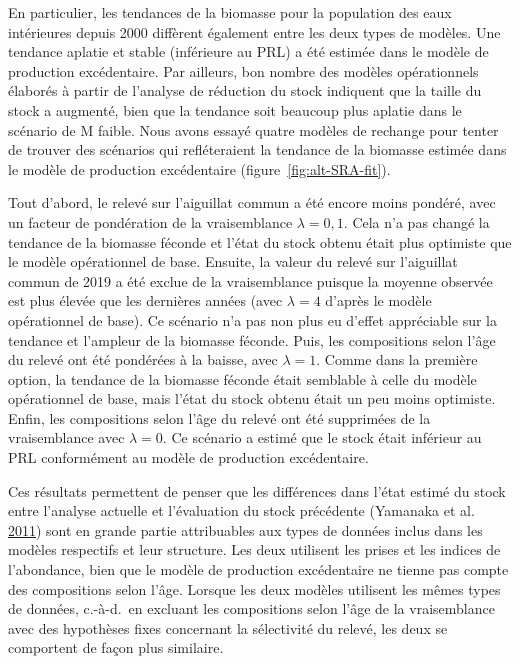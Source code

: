 \documentclass[french,11pt]{book}
\begin{document}
En particulier, les tendances de la biomasse pour la population des eaux intérieures depuis 2000 diffèrent également entre les deux types de modèles. Une tendance aplatie et stable (inférieure au PRL) a été estimée dans le modèle de production excédentaire. Par ailleurs, bon nombre des modèles opérationnels élaborés à partir de l'analyse de réduction du stock indiquent que la taille du stock a augmenté, bien que la tendance soit beaucoup plus aplatie dans le scénario de M faible. Nous avons essayé quatre modèles de rechange pour tenter de trouver des scénarios qui refléteraient la tendance de la biomasse estimée dans le modèle de production excédentaire (figure~\ref{fig:alt-SRA-fit}).

Tout d'abord, le relevé sur l'aiguillat commun a été encore moins pondéré, avec un facteur de pondération de la vraisemblance \(\lambda = 0,1\). Cela n'a pas changé la tendance de la biomasse féconde et l'état du stock obtenu était plus optimiste que le modèle opérationnel de base. Ensuite, la valeur du relevé sur l'aiguillat commun de 2019 a été exclue de la vraisemblance puisque la moyenne observée est plus élevée que les dernières années (avec \(\lambda = 4\) d'après le modèle opérationnel de base). Ce scénario n'a pas non plus eu d'effet appréciable sur la tendance et l'ampleur de la biomasse féconde. Puis, les compositions selon l'âge du relevé ont été pondérées à la baisse, avec \(\lambda = 1\). Comme dans la première option, la tendance de la biomasse féconde était semblable à celle du modèle opérationnel de base, mais l'état du stock obtenu était un peu moins optimiste. Enfin, les compositions selon l'âge du relevé ont été supprimées de la vraisemblance avec \(\lambda = 0\). Ce scénario a estimé que le stock était inférieur au PRL conformément au modèle de production excédentaire.

Ces résultats permettent de penser que les différences dans l'état estimé du stock entre l'analyse actuelle et l'évaluation du stock précédente (Yamanaka et al. \protect\hyperlink{ref-yamanaka2011}{2011}) sont en grande partie attribuables aux types de données inclus dans les modèles respectifs et leur structure. Les deux utilisent les prises et les indices de l'abondance, bien que le modèle de production excédentaire ne tienne pas compte des compositions selon l'âge. Lorsque les deux modèles utilisent les mêmes types de données, c.-à-d.~en excluant les compositions selon l'âge de la vraisemblance avec des hypothèses fixes concernant la sélectivité du relevé, les deux se comportent de façon plus similaire.
\end{document}
